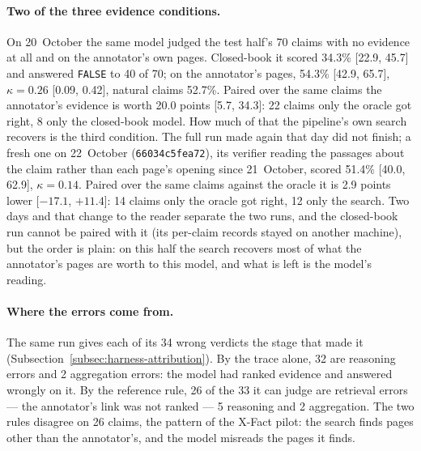 \paragraph{Two of the three evidence conditions.} On 20~October the
same model judged the test half's 70 claims with no evidence at all and
on the annotator's own pages. Closed-book it scored 34.3\% [22.9, 45.7]
and answered \texttt{FALSE} to 40 of 70; on the annotator's pages,
54.3\% [42.9, 65.7], $\kappa = 0.26$ [0.09, 0.42], natural claims
52.7\%. Paired over the same claims the annotator's evidence is worth
20.0 points [5.7, 34.3]: 22 claims only the oracle got right, 8 only the
closed-book model. How much of that the pipeline's own search recovers
is the third condition. The full run made again that day did not
finish; a fresh one on 22~October (\texttt{66034c5fea72}), its verifier
reading the passages about the claim rather than each page's opening
since 21~October, scored 51.4\% [40.0, 62.9], $\kappa = 0.14$. Paired
over the same claims against the oracle it is 2.9 points lower
[$-17.1$, $+11.4$]: 14 claims only the oracle got right, 12 only the
search. Two days and that change to the reader separate the two runs,
and the closed-book run cannot be paired with it (its per-claim records
stayed on another machine), but the order is plain: on this half the
search recovers most of what the annotator's pages are worth to this
model, and what is left is the model's reading.

\paragraph{Where the errors come from.} The same run gives each of its
34 wrong verdicts the stage that made it
(Subsection~\ref{subsec:harness-attribution}). By the trace alone, 32
are reasoning errors and 2 aggregation errors: the model had ranked
evidence and answered wrongly on it. By the reference rule, 26 of the
33 it can judge are retrieval errors --- the annotator's link was not
ranked --- 5 reasoning and 2 aggregation. The two rules disagree on 26
claims, the pattern of the X-Fact pilot: the search finds pages other
than the annotator's, and the model misreads the pages it finds.

